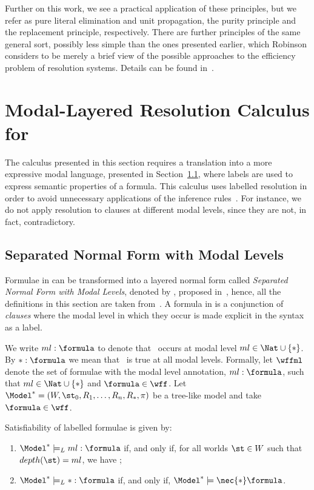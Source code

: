 Further on this work, we see a practical application of these principles, but we
refer as pure literal elimination and unit propagation, the purity principle and
the replacement principle, respectively. There are further principles of the
same general sort, possibly less simple than the ones presented earlier, which
Robinson considers to be merely a brief view of the possible approaches to the
efficiency problem of resolution systems. Details can be found
in~\cite{Robinson65}.

\section{Modal-Layered Resolution Calculus for }%
\label{sec:calculus}

The calculus presented in this section requires a translation into a more
expressive modal language, presented in Section~\ref{sec:snf}, where labels are
used to express semantic properties of a formula. This calculus uses 
labelled resolution in order to avoid unnecessary applications of the inference
rules~\cite{nalon2015modal}. For instance, we do not apply resolution to clauses
at different modal levels, since they are not, in fact, contradictory.

\subsection{Separated Normal Form with Modal Levels}%
\label{sec:snf}

Formulae in  can be transformed into a layered normal form called
\emph{Separated Normal Form with Modal Levels}, denoted by , proposed
in~\cite{journals/jal/NalonD07}, hence, all the definitions in this section are
taken from~\cite{journals/jal/NalonD07}. A formula in  is a
conjunction of \emph{clauses} where the modal level in which they occur is made
explicit in the syntax as a label.

We write $ml: \formula$ to denote that \formula~occurs at modal level $ml\in
\Nat \cup \{*\}$. By $*: \formula$ we mean that \formula~is true at
all modal levels. Formally, let $\wffml$ denote the set of formulae with
the modal level annotation, $ml : \formula$, such that $ml \in \Nat \cup \{*\}$
and $\formula \in \wff$. Let $\Model^* = (W, \st_0, R_1, \ldots, R_n, R_*, \pi)$
be a tree-like model and take $\formula \in \wff$. 

\begin{definition}
Satisfiability of labelled formulae is given by:

\begin{enumerate}
    \item $\Model^* \models_L ml : \formula$ if, and only if, for all worlds
        $\st \in W$ such that $depth(\st) = ml$, we have
        \sat{\Model^*}{\st}{\formula};
    \item $\Model^* \models_L * : \formula$ if, and only if, $\Model^* \models
        \nec{*} \formula$.
\end{enumerate}
    
\end{definition}

